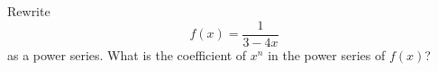 Rewrite 
\[
f(x) = \frac{1}{3 - 4x}
\]
as a power series.
What is the coefficient of $x^n$ in the power series of $f(x)$?
